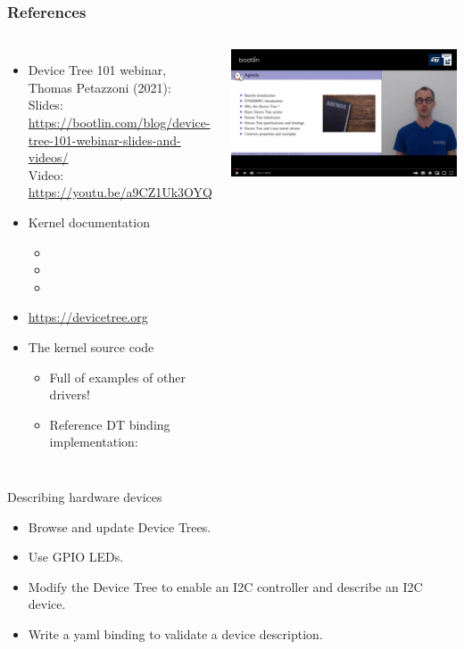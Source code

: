 \begin{frame}
  \frametitle{References}
  \begin{columns}
       \begin{itemize}
       \item Device Tree 101 webinar, Thomas Petazzoni (2021):\\
	     Slides: \url{https://bootlin.com/blog/device-tree-101-webinar-slides-and-videos/}\\
	     Video: \url{https://youtu.be/a9CZ1Uk3OYQ}
       \item Kernel documentation
         \begin{itemize}
         \item {}
         \item {}
         \item {}
         \end{itemize}
      \item \url{https://devicetree.org}
       \item The kernel source code
         \begin{itemize}
         \item Full of examples of other drivers!
         \item Reference DT binding implementation:
         \end{itemize}
       \end{itemize}
    \includegraphics[width=\textwidth]{common/device-tree-video.jpg}
  \end{columns}
\end{frame}

\setuplabframe
{Describing hardware devices}
{
  \begin{itemize}
  \item Browse and update Device Trees.
  \item Use GPIO LEDs.
  \item Modify the Device Tree to enable an I2C controller and describe
    an I2C device.
  \item Write a yaml binding to validate a device description.

  \end{itemize}
}
